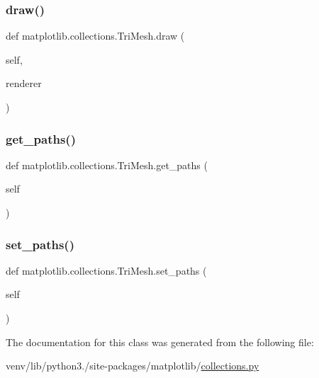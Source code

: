 \subsubsection{\texorpdfstring{draw()}{draw()}}
{\footnotesize\ttfamily def matplotlib.\+collections.\+Tri\+Mesh.\+draw (\begin{DoxyParamCaption}\item[{}]{self,  }\item[{}]{renderer }\end{DoxyParamCaption})}

\mbox{\label{classmatplotlib_1_1collections_1_1TriMesh_a957bed430ae9956c172fb90dc46c47c8}} 
\subsubsection{\texorpdfstring{get\+\_\+paths()}{get\_paths()}}
{\footnotesize\ttfamily def matplotlib.\+collections.\+Tri\+Mesh.\+get\+\_\+paths (\begin{DoxyParamCaption}\item[{}]{self }\end{DoxyParamCaption})}

\mbox{\label{classmatplotlib_1_1collections_1_1TriMesh_a24af32e85fa5b29de710119cae0aff63}} 
\subsubsection{\texorpdfstring{set\+\_\+paths()}{set\_paths()}}
{\footnotesize\ttfamily def matplotlib.\+collections.\+Tri\+Mesh.\+set\+\_\+paths (\begin{DoxyParamCaption}\item[{}]{self }\end{DoxyParamCaption})}



The documentation for this class was generated from the following file\+:\begin{DoxyCompactItemize}
\item 
venv/lib/python3./site-\/packages/matplotlib/\hyperlink{collections_8py}{collections.\+py}\end{DoxyCompactItemize}
